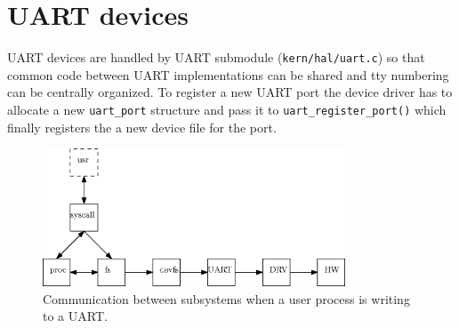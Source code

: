 \section{UART devices}

UART devices are handled by UART submodule (\verb+kern/hal/uart.c+) so that
common code between UART implementations can be shared and tty numbering can
be centrally organized. To register a new UART port the device driver has to
allocate a new \verb+uart_port+ structure and pass it to
\verb+uart_register_port()+ which finally registers the a new device file for
the port.

\begin{figure}
  \center
  \includegraphics[width=9cm]{pics/uart}
  \caption{Communication between subsystems when a user process is writing to a UART.}
  \label{figure:dir}
\end{figure}

